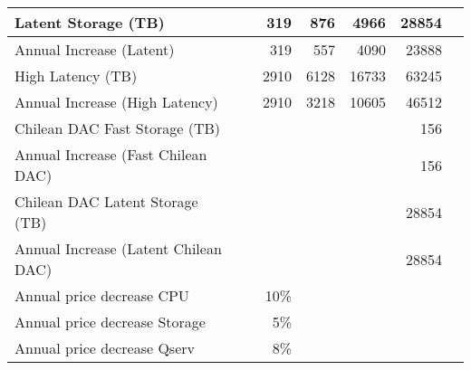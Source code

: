 \begin{longtable} { |p{}  |r  |r  |r  |r  |r  |r |}
{Latent Storage  (TB)}&{}&{319}&{876}&{4966}&{28854} \\ \hline
{Annual Increase (Latent)}&{}&{319}&{557}&{4090}&{23888} \\ \hline
{High Latency (TB)}&{}&{2910}&{6128}&{16733}&{63245} \\ \hline
{Annual Increase (High Latency)}&{}&{2910}&{3218}&{10605}&{46512} \\ \hline
{Chilean DAC Fast Storage (TB)}&{}&{}&{}&{}&{156} \\ \hline
{Annual Increase (Fast Chilean DAC)}&{}&{}&{}&{}&{156} \\ \hline
{Chilean DAC Latent Storage (TB)}&{}&{}&{}&{}&{28854} \\ \hline
{Annual Increase (Latent Chilean DAC)}&{}&{}&{}&{}&{28854} \\ \hline
{Annual price decrease CPU}&{}&{10\%}&{}&{}&{} \\ \hline
{Annual price decrease Storage}&{}&{5\%}&{}&{}&{} \\ \hline
{Annual price decrease Qserv}&{}&{8\%}&{}&{}&{} \\ \hline
\end{longtable} \normalsize

